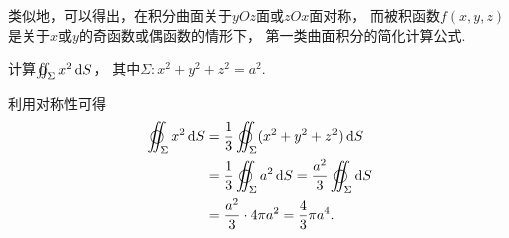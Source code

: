 类似地，可以得出，在积分曲面关于\(yOz\)面或\(zOx\)面对称，
而被积函数\(f(x,y,z)\)是关于\(x\)或\(y\)的奇函数或偶函数的情形下，
第一类曲面积分的简化计算公式.

\begin{example}
计算\(\varoiint_\Sigma x^2 \dd{S}\)，
其中\(\Sigma: x^2+y^2+z^2=a^2\).
\begin{solution}
利用对称性可得\begin{align*}
	\varoiint_\Sigma x^2 \dd{S}
	&= \frac{1}{3} \varoiint_\Sigma (x^2+y^2+z^2) \dd{S} \\
	&= \frac{1}{3} \varoiint_\Sigma a^2 \dd{S}
	= \frac{a^2}{3} \varoiint_\Sigma \dd{S} \\
	&= \frac{a^2}{3} \cdot 4\pi a^2
	= \frac{4}{3} \pi a^4.
\end{align*}
\end{solution}
\end{example}


